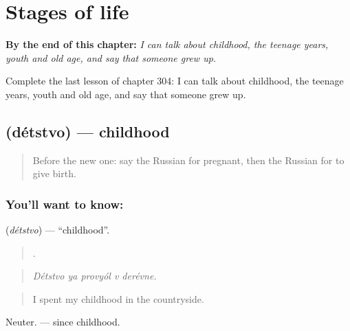 
\chapter{Stages of life}
\label{ch:ru-stages-of-life}

\begin{chapteropening}
\textbf{By the end of this chapter:} \emph{I can talk about childhood, the teenage years, youth and old age, and say that someone grew up.}

Complete the last lesson of chapter 304: I can talk about childhood, the teenage years, youth and old age, and say that someone grew up.
\end{chapteropening}

\section[\texorpdfstring{\ru{детство} (détstvo)}{детство (détstvo)}]{ (détstvo) — childhood}

\label{lesson:RU-C304-detstvo}



\begin{quote}
Before the new one: say the Russian for pregnant, then the Russian for to give birth.
\end{quote}

\subsection*{You'll want to know: }
\textbf{} (\emph{détstvo}) — \textquotedblleft{}childhood\textquotedblright{}.

\begin{quote}
    .
\end{quote}

\begin{quote}
\emph{Détstvo ya provyól v derévne.}
\end{quote}

\begin{quote}
I spent my childhood in the countryside.
\end{quote}

Neuter. \emph{ } — since childhood.

